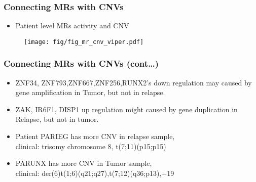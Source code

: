 \documentclass{beamer}
\begin{document}
\begin{frame}
\frametitle{Connecting MRs with CNVs}
 \begin{itemize}
  	\item Patient level MRs activity and CNV
\end{itemize}

\begin{figure}
	\texttt{[image: fig/fig\_mr\_cnv\_viper.pdf]}
\end{figure}

\end{frame}
\begin{frame}
\frametitle{Connecting MRs with CNVs (cont\dots)}

 \begin{itemize}
  	\item ZNF34, ZNF793,ZNF667,ZNF256,RUNX2's down regulation may 
  		caused by gene amplification in Tumor, but not in relapse.
	\item ZAK, IR6F1, DISP1 up regulation might caused by gene duplication in Relapse, but not in tumor.
  	\item Patient PARIEG has more CNV in relapse sample, \\ 
  			clinical: trisomy chromosome 8, t(7;11)(p15;p15)
  	\item PARUNX has more CNV in Tumor sample, \\
  			clinical: der(6)t(1;6)(q21;q27),t(7;12)(q36;p13),+19
\end{itemize}

\end{frame}
\end{document}
